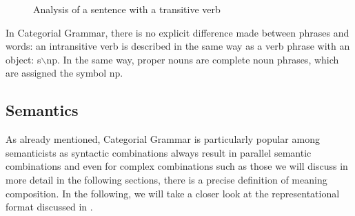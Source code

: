 \begin{figure}
\centerline{%
}
\caption{\label{abb-the-cat-chased-Mary}Analysis of a sentence with a transitive verb}
\end{figure}%

\noindent
In Categorial Grammar, there is no explicit difference made between phrases and words: an intransitive verb is described in the same way as a verb phrase with an
object:  s$\backslash$np. In the same way, proper nouns are complete noun phrases, which are assigned the symbol np.\is{$\backslash$|)}

\subsection{Semantics}

As already mentioned, Categorial Grammar is particularly popular among semanticists as syntactic
combinations always result in parallel semantic combinations and even for complex combinations such
as those we will discuss in more detail in the following sections, there is a precise definition of
meaning composition.
In the following, we will take a closer look at the representational format discussed in \citet[Section~2.1.2]{Steedman97a}.

